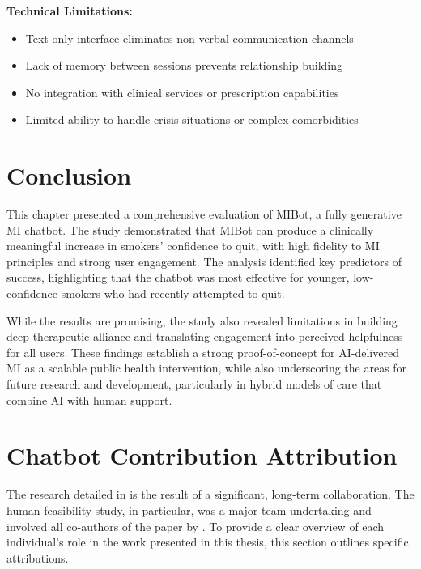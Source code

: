 \textbf{Technical Limitations:}
\begin{itemize}
\item Text-only interface eliminates non-verbal communication channels
\item Lack of memory between sessions prevents relationship building
\item No integration with clinical services or prescription capabilities
\item Limited ability to handle crisis situations or complex comorbidities
\end{itemize}

\section{Conclusion}
\label{sec:conclusion}

This chapter presented a comprehensive evaluation of MIBot, a fully generative MI chatbot. The study demonstrated that MIBot can produce a clinically meaningful increase in smokers' confidence to quit, with high fidelity to MI principles and strong user engagement. The analysis identified key predictors of success, highlighting that the chatbot was most effective for younger, low-confidence smokers who had recently attempted to quit.

While the results are promising, the study also revealed limitations in building deep therapeutic alliance and translating engagement into perceived helpfulness for all users. These findings establish a strong proof-of-concept for AI-delivered MI as a scalable public health intervention, while also underscoring the areas for future research and development, particularly in hybrid models of care that combine AI with human support.


\section{Chatbot Contribution Attribution}

The research detailed in  is the result of a significant, long-term collaboration. The human feasibility study, in particular, was a major team undertaking and involved all co-authors of the paper by \citet{mahmood-etal-2025-fully}. To provide a clear overview of each individual's role in the work presented in this thesis, this section outlines specific attributions.

